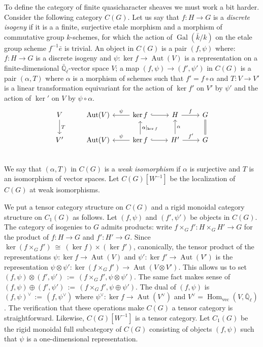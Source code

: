 \documentclass[11pt]{amsart}
\theoremstyle{plain}
\theoremstyle{definition}
\theoremstyle{remark}
\newcommand{\EE}{\mathbb{\bar Q}_\ell}
\newcommand{\bFq}{\bar{k}}
\newcommand{\Fq}{k}
\DeclareMathOperator{\Gal}{Gal}
\DeclareMathOperator{\Aut}{Aut}
\DeclareMathOperator{\Hom}{Hom}
\newcommand{\cdef}[1]{ {#1}\index{#1} }
\newcommand{\ceq}{{\, :=\, }}
\newcommand{\iso}{{\ \cong\ }}
\begin{document}
To define the category of finite quasicharacter sheaves we must work a bit harder.
Consider the following category $C(G)$.
Let us say that $f : H\to G$ is a \emph{discrete isogeny} if it is a a finite, surjective etale morphism and a morphism of commutative group $\Fq$-schemes, for which the action of $\Gal(\bFq/\Fq)$ on the etale group scheme $f^{-1}{\bar e}$ is trivial.
An object in $C(G)$ is a pair $(f,\psi)$ where: 
$f : H\to G$ is a discrete isogeny 
and $\psi : \ker f\to \Aut(V)$ is a representation on a finite-dimensional $\EE$-vector space $V$;
a map $(f,\psi) \to (f',\psi')$ in $C(G)$ is a pair $(\alpha,T)$ 
where $\alpha$ is a morphism of schemes such that $f' = f\circ \alpha$
and $T : V\to V'$ is a linear transformation equivariant 
for the action of $\ker f'$ on $V'$ by $\psi'$ 
and the action of $\ker '$ on $V$ by $\psi \circ \alpha$.
\[
\begin{tikzcd}
V \arrow{d}{T} & \Aut(V) & \arrow[swap]{l}{\psi} \ker f \arrow[hook]{r} & H \arrow{r}{f} & \arrow[equal]{d} G\\
V' & \Aut(V) & \arrow[swap]{l}{\psi} \arrow[swap]{u}{\alpha\vert_{\ker f}} \ker f \arrow[hook]{r} & \arrow[swap]{u}{\alpha} H' \arrow{r}{f'} & G\\
\end{tikzcd}
\]
We say that $(\alpha,T)$ in $C(G)$ is a \emph{weak isomorphism} if $\alpha$ is surjective
and $T$ is an isomorphism of vector spaces.
Let \cdef{$C(G)[W^{-1}]$} be the localization of $C(G)$ at weak isomorphisms.

We put a tensor category structure on $C(G)$ 
and a rigid monoidal category structure on $C_1(G)$ as follows.
Let $(f,\psi)$ and $(f',\psi')$ be objects in $C(G)$. 
The category of isogenies to $G$ admits products: 
write $f\times_G f' : H\times_G H' \to G$ for the product of $f : H\to G$ and $f' : H'\to G$. 
Since $\ker(f\times_G f') \iso (\ker f)\times (\ker f')$, canonically,
the tensor product of the representations $\psi : \ker f\to \Aut(V)$ and $\psi' : \ker f'\to \Aut(V')$ 
is the representation $\psi \otimes\psi' :  \ker(f\times_G f') \to \Aut(V\otimes V')$. 
This allows us to set $(f,\psi)\otimes(f',\psi') \ceq (f\times_G f' ,\psi\otimes\psi')$. 
The same fact makes sense of $(f,\psi)\oplus(f',\psi')\ceq (f\times_G f' ,\psi\oplus\psi')$. 
The dual of $(f,\psi)$ is $(f,\psi)^\vee \ceq (f,\psi^\vee)$ 
where $\psi^\vee : \ker f \to \Aut(V^\vee)$ and $V^\vee = \Hom_\text{vec}(V,\EE)$. 
The verification that these operations make $C(G)$ a tensor category is straightforward.
Likewise, $C(G)[W^{-1}]$ is a tensor category.
Let $C_1(G)$ be the rigid monoidal full subcategory of $C(G)$ consisting of objects $(f,\psi)$ such that $\psi$ is a one-dimensional representation.
\end{document}

